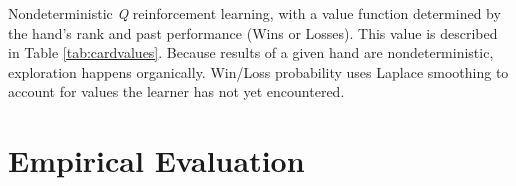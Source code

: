 \documentclass[12pt,pdftex,twocolumn]{article}
\begin{document}
Nondeterministic \emph{Q} reinforcement learning, with a value function determined by the hand's rank and past performance (Wins or Losses). This value is described in Table \ref{tab:cardvalues}. 
Because results of a given hand are nondeterministic, exploration happens organically. 
Win/Loss probability uses Laplace smoothing to account for values the learner has not yet encountered.


\section{Empirical Evaluation}

\end{document}
